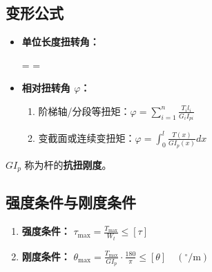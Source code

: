 \subsection{变形公式}
\begin{itemize}
    \item \textbf{单位长度扭转角：} 
    \begin{myformula}
        \theta =  = 
    \end{myformula}
    
    \item \textbf{相对扭转角 $\varphi$：}
    \begin{enumerate}
        \item 阶梯轴/分段等扭矩：$\varphi = \sum_{i=1}^{n} \frac{T_i l_i}{G_i I_{pi}}$
        \item 变截面或连续变扭矩：$\varphi = \int_0^l \frac{T(x)}{G I_p(x)} dx$
    \end{enumerate}
\end{itemize}
$G I_p$ 称为杆的\textbf{抗扭刚度}。

\subsection{强度条件与刚度条件}
\begin{enumerate}
    \item \textbf{强度条件：} $\tau_{\max} = \frac{T_{\max}}{W_t} \le [\tau]$
    \item \textbf{刚度条件：} $\theta_{\max} = \frac{T_{\max}}{G I_p} \cdot \frac{180}{\pi} \le [\theta] \quad (^\circ/\text{m})$
\end{enumerate}

